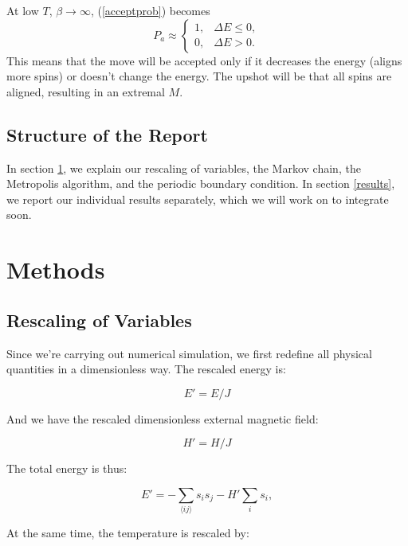 \documentclass[11pt]{article}
\begin{document}
At low $T$, $\beta \rightarrow \infty$, (\ref{acceptprob}) becomes
\begin{equation}
    P_a \approx \begin{cases}
        1, & \Delta E \leq 0, \\
        0, & \Delta E > 0.
    \end{cases}
\end{equation}
This means that the move will be accepted only if it decreases the energy (aligns more spins) or doesn't change the energy. The upshot will be that all spins are aligned, resulting in an extremal $M$.

\subsection{Structure of the Report}
In section \ref{methods}, we explain our rescaling of variables, the Markov chain, the Metropolis algorithm, and the periodic boundary condition. In section \ref{results}, we report our individual results separately, which we will work on to integrate soon.

\section{Methods}\label{methods}

\subsection{Rescaling of Variables}

Since we're carrying out numerical simulation, we first redefine all physical quantities in a dimensionless way. The rescaled energy is:

\begin{equation}
    E' = E / J
\end{equation}

And we have the rescaled dimensionless external magnetic field:

\begin{equation}
    H' = H / J
\end{equation}

The total energy is thus:

\begin{equation}
    E' = -\sum_{\langle ij \rangle} s_i s_j - H' \sum_{i} s_i,
\end{equation}

At the same time, the temperature is rescaled by:
\end{document}
